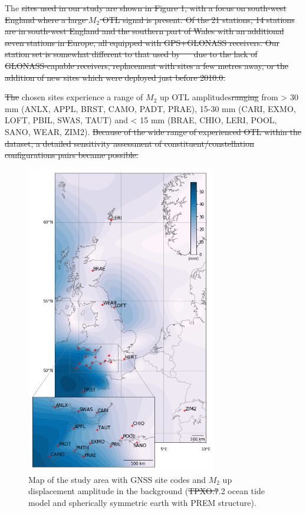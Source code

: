\documentclass[se, manuscript]{copernicus}
\providecommand{\DIFadd}[1]{{\protect\color{blue}\uwave{#1}}} %
\providecommand{\DIFdel}[1]{{\protect\color{red}\sout{#1}}}                      %
\providecommand{\DIFaddbegin}{} %
\providecommand{\DIFaddend}{} %
\providecommand{\DIFdelbegin}{} %
\providecommand{\DIFdelend}{} %
\providecommand{\DIFaddFL}[1]{\DIFadd{#1}} %
\providecommand{\DIFdelFL}[1]{\DIFdel{#1}} %
\providecommand{\DIFaddbeginFL}{} %
\providecommand{\DIFaddendFL}{} %
\providecommand{\DIFdelbeginFL}{} %
\providecommand{\DIFdelendFL}{} %
\begin{document}
The \DIFdelbegin \DIFdel{sites used in our study are shown in Figure 1, with a focus on south-west England where a large $M_2$ OTL signal is present. Of the 21 stations, 14 stations are in south-west England and the southern part of Wales with an additional seven stations in Europe, all equipped with GPS+GLONASS receivers. Our station set is somewhat different to that used by \mbox{%
\cite{Penna2015} }\hspace{0pt}%
due to the lack of GLONASS-capable receivers, replacement with sites a few metres away, or the addition of new sites which were deployed just before 2010.0.
}%

\DIFdel{The }\DIFdelend chosen sites experience a range of $M_2$ up OTL amplitudes\DIFdelbegin \DIFdel{ranging }\DIFdelend \DIFaddbegin \DIFadd{, }\DIFaddend from > 30 mm (ANLX, APPL, BRST, CAMO, PADT, PRAE), 15-30 mm (CARI, EXMO, LOFT, PBIL, SWAS, TAUT) and < 15 mm (BRAE, CHIO, LERI, POOL, SANO, WEAR, ZIM2).
\DIFdelbegin \DIFdel{Because of the wide range of experienced OTL within the dataset, a detailed sensitivity assessment of constituent/constellation configurations pairs became possible.
}\DIFdelend 

\begin{figure}[t]
\DIFdelbeginFL %
\DIFdelendFL \DIFaddbeginFL \includegraphics[width=8.3cm]{fig01_updated.png}
\DIFaddendFL \caption{Map of the study area with GNSS site codes and $M_2$ up displacement amplitude in the background (\DIFdelbeginFL \DIFdelFL{TPXO.7}\DIFdelendFL \DIFaddbeginFL \DIFaddFL{TPXO7}\DIFaddendFL .2 ocean tide model and spherically symmetric earth with PREM structure).}
\end{figure}
\end{document}
